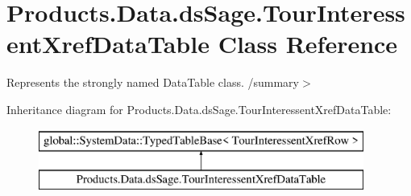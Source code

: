 \hypertarget{class_products_1_1_data_1_1ds_sage_1_1_tour_interessent_xref_data_table}{}\section{Products.\+Data.\+ds\+Sage.\+Tour\+Interessent\+Xref\+Data\+Table Class Reference}
\label{class_products_1_1_data_1_1ds_sage_1_1_tour_interessent_xref_data_table}


Represents the strongly named Data\+Table class. /summary$>$  


Inheritance diagram for Products.\+Data.\+ds\+Sage.\+Tour\+Interessent\+Xref\+Data\+Table\+:\begin{figure}[H]
\begin{center}
\leavevmode
\includegraphics[height=2.000000cm]{class_products_1_1_data_1_1ds_sage_1_1_tour_interessent_xref_data_table}
\end{center}
\end{figure}

